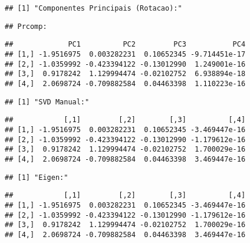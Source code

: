 \documentclass[
]{article}
\begin{document}
\begin{verbatim}
## [1] "Componentes Principais (Rotacao):"
\end{verbatim}

\begin{verbatim}
## Prcomp:
\end{verbatim}

\begin{verbatim}
##             PC1          PC2         PC3           PC4
## [1,] -1.9516975  0.003282231  0.10652345 -9.714451e-17
## [2,] -1.0359992 -0.423394122 -0.13012990  1.249001e-16
## [3,]  0.9178242  1.129994474 -0.02102752  6.938894e-18
## [4,]  2.0698724 -0.709882584  0.04463398  1.110223e-16
\end{verbatim}

\begin{verbatim}
## [1] "SVD Manual:"
\end{verbatim}

\begin{verbatim}
##            [,1]         [,2]        [,3]          [,4]
## [1,] -1.9516975  0.003282231  0.10652345 -3.469447e-16
## [2,] -1.0359992 -0.423394122 -0.13012990 -1.179612e-16
## [3,]  0.9178242  1.129994474 -0.02102752  1.700029e-16
## [4,]  2.0698724 -0.709882584  0.04463398  3.469447e-16
\end{verbatim}

\begin{verbatim}
## [1] "Eigen:"
\end{verbatim}

\begin{verbatim}
##            [,1]         [,2]        [,3]          [,4]
## [1,] -1.9516975  0.003282231  0.10652345 -3.469447e-16
## [2,] -1.0359992 -0.423394122 -0.13012990 -1.179612e-16
## [3,]  0.9178242  1.129994474 -0.02102752  1.700029e-16
## [4,]  2.0698724 -0.709882584  0.04463398  3.469447e-16
\end{verbatim}
\end{document}
